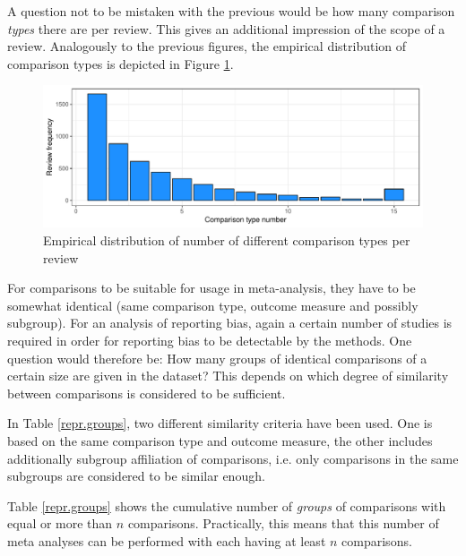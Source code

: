\documentclass[11pt,a4paper,twoside]{book}\usepackage[]{graphicx}\usepackage[]{color}
\newenvironment{knitrout}{}{} %
\begin{document}
A question not to be mistaken with the previous would be how many comparison \textit{types} there are per review. This gives an additional impression of the scope of a review. Analogously to the previous figures, the empirical distribution of comparison types is depicted in Figure \ref{subjects.per.review}.


\begin{figure}
\begin{knitrout}
\color{fgcolor}

{\centering \includegraphics[width=\textwidth-3cm]{figure/ch02_figunnamed-chunk-12-1} 

}



\end{knitrout}
\caption{Empirical distribution of number of different comparison types per review}
\label{subjects.per.review}
\end{figure}

For comparisons to be suitable for usage in meta-analysis, they have to be somewhat identical (same comparison type, outcome measure and possibly subgroup). For an analysis of reporting bias, again a certain number of studies is required in order for reporting bias to be detectable by the methods. One question would therefore be: How many groups of identical comparisons of a certain size are given in the dataset? This depends on which degree of similarity between comparisons is considered to be sufficient.

\vspace{0mm}
In Table \ref{repr.groups}, two different similarity criteria have been used. One is based on the same comparison type and outcome measure, the other includes additionally subgroup affiliation of comparisons, i.e. only comparisons in the same subgroups are considered to be similar enough.

\vspace{0mm}
Table \ref{repr.groups} shows the cumulative number of \textit{groups} of comparisons with equal or more than $n$ comparisons. Practically, this means that this number of meta analyses can be performed with each having at least $n$ comparisons.
\end{document}
